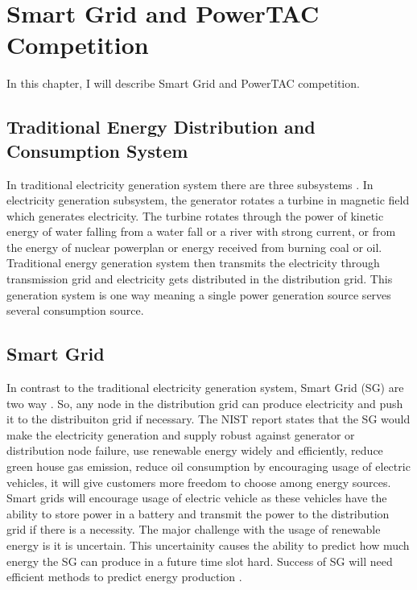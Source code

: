 
\chapter{Smart Grid and PowerTAC Competition}

In this chapter, I will describe Smart Grid and PowerTAC competition.

\section{Traditional Energy Distribution and Consumption System}
In traditional electricity generation system there are three subsystems \cite{fang2012smart}. In electricity generation subsystem, the generator rotates a turbine in magnetic field which generates electricity. The turbine rotates through the power of kinetic energy of water falling from a water fall or a river with strong current, or from the energy of nuclear powerplan or energy received from burning coal or oil. Traditional energy generation system then transmits the electricity through transmission grid and electricity gets distributed in the distribution grid. This generation system is one way meaning a single power generation source serves several consumption source.



\section{Smart Grid}
In contrast to the traditional electricity generation system, Smart Grid (SG) are two way \cite{fang2012smart}. So, any node in the distribution grid can produce electricity and push it to the distribuiton grid if necessary. The NIST report \cite{fang2012smart} states that the SG would make the electricity generation and supply robust against generator or distribution node failure, use renewable energy widely and efficiently, reduce green house gas emission, reduce oil consumption by encouraging usage of electric vehicles, it will give customers more freedom to choose among energy sources. Smart grids will encourage usage of electric vehicle as these vehicles have the ability to store power in a battery and transmit the power to the distribution grid if there is a necessity. The major challenge with the usage of renewable energy is it is uncertain. This uncertainity causes the ability to predict how much energy the SG can produce in a future time slot hard. Success of SG will need efficient methods to predict energy production \cite{potter2009building}.


